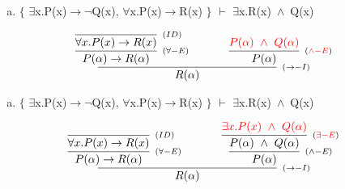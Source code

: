 \documentclass[aspectratio=43]{beamer}
\newcommand{\ria}{$\rightarrow$}
\newcommand{\fall}{$\forall$}
\newcommand{\ex}{$\exists$}
\newcommand{\nao}{$\neg$}
\newcommand{\andd}{$\wedge$}
\begin{document}
    \begin{frame}[fragile]
    
    	\begin{enumerate}[d)]
			\item $\{$ \ex x.P(x)\ria \nao Q(x), \fall x.P(x)\ria R(x) $\}$ $\vdash$ \ex x.R(x)\ \andd\ Q(x) \\
		\end{enumerate}
        
        \vspace{70pt}
        
        \[
        \begin{array}{c}
		
        	\infer[_{(\to -I)}]
            	{R(\alpha)}
            	{\infer[_{(\forall -E)}]
                	{P(\alpha) \rightarrow R(\alpha)} 
                    {\infer[_{(ID)}]
                    	{\forall x.P(x)\to R(x)}
                    	{}
                    }  
            	\hspace{35pt}
                \infer[_{(\textcolor{red}{\land -E})}] 
                	{P(\alpha)}
                    {\textcolor{red}{P(\alpha)\ \land \ Q(\alpha)}}
                }
		\end{array}
        \]
        
	\end{frame}
    
    \begin{frame}[fragile]
    
    	\begin{enumerate}[d)]
			\item $\{$ \ex x.P(x)\ria \nao Q(x), \fall x.P(x)\ria R(x) $\}$ $\vdash$ \ex x.R(x)\ \andd\ Q(x) \\
		\end{enumerate}
        
        \vspace{65pt}
        
        \[
        \begin{array}{c}
		
        	\infer[_{(\to -I)}]
            	{R(\alpha)}
            	{\infer[_{(\forall -E)}]
                	{P(\alpha) \rightarrow R(\alpha)} 
                    {\infer[_{(ID)}]
                    	{\forall x.P(x)\to R(x)}
                    	{}
                    }  
            	\hspace{35pt}
                \infer[_{(\land -E)}] 
                	{P(\alpha)}
                    {\infer[_{(\textcolor{red}{\exists -E})}]
                    	{P(\alpha)\ \land \ Q(\alpha)}
                    	{\textcolor{red}{\exists x.P(x)\ \land \ Q(\alpha)}}
                    }
                }
		\end{array}
        \]
        
	\end{frame}
    
\end{document}
